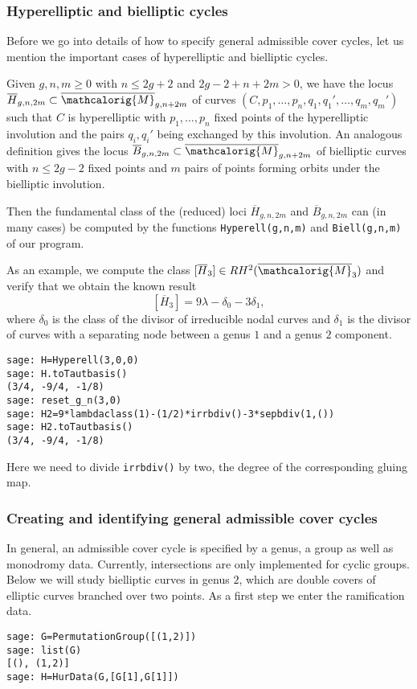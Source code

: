 \documentclass[11pt]{article}
\newcommand{\M}{\ensuremath{\overline{\mathcalorig{M}}}}
\begin{document}
\subsubsection{Hyperelliptic and bielliptic cycles}
Before we go into details of how to specify general admissible cover cycles, let us mention the important cases of hyperelliptic and bielliptic cycles.

Given $g,n,m \geq 0$ with $n \leq 2g+2$ and  $2g-2+n+2m >0$, we have the locus $\overline{H}_{g,n,2m} \subset \M_{g,n+2m}$ of curves $(C,p_1, \ldots, p_n, q_1, q_1', \ldots, q_{m}, q_{m}')$ such that $C$ is hyperelliptic with $p_1, \ldots, p_n$ fixed points of the hyperelliptic involution and the pairs $q_i, q_i'$ being exchanged by this involution. An analogous definition gives the locus $\overline{B}_{g,n,2m} \subset \M_{g,n+2m}$ of bielliptic curves with $n \leq 2g-2$ fixed points and $m$ pairs of points forming orbits under the bielliptic involution.

Then the fundamental class of the (reduced) loci $\overline{H}_{g,n,2m}$ and $\overline{B}_{g,n,2m}$ can (in many cases) be computed by the functions \verb|Hyperell(g,n,m)| and \verb|Biell(g,n,m)| of our program.

As an example, we compute the class $[\overline{H}_{3}] \in RH^2(\M_3)$ and verify that we obtain the known result \[[\overline{H}_{3}]=9\lambda - \delta_0 - 3\delta_1,\]
where $\delta_0$ is the class of the divisor of irreducible nodal curves and $\delta_1$ is the divisor of curves with a separating node between a genus $1$ and a genus $2$ component.
\begin{lstlisting}
sage: H=Hyperell(3,0,0)
sage: H.toTautbasis()
(3/4, -9/4, -1/8)
sage: reset_g_n(3,0)
sage: H2=9*lambdaclass(1)-(1/2)*irrbdiv()-3*sepbdiv(1,())
sage: H2.toTautbasis()
(3/4, -9/4, -1/8)
\end{lstlisting}
Here we need to divide \verb|irrbdiv()| by two, the degree of the corresponding gluing map.

\subsubsection{Creating and identifying general admissible cover cycles}
In general, an admissible cover cycle is specified by a genus, a group as well as monodromy data. Currently, intersections are only implemented for cyclic groups. Below we will study bielliptic curves in genus $2$, which are double covers of elliptic curves branched over two points. As a first step we enter the ramification data.
\begin{lstlisting}
sage: G=PermutationGroup([(1,2)])
sage: list(G)
[(), (1,2)]
sage: H=HurData(G,[G[1],G[1]])
\end{lstlisting}
\end{document}
